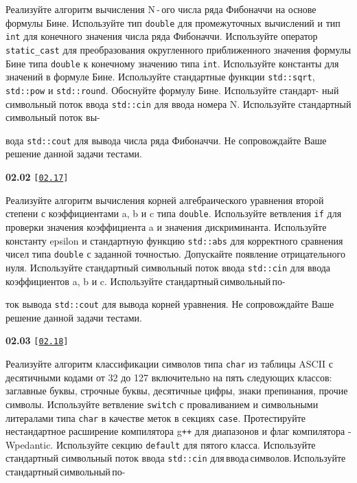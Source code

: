 \documentclass[a4paper,12pt]{article}
\begin{document}
\bigskip

Реализуйте алгоритм вычисления N\,-\,ого числа ряда Фибоначчи на основе формулы Бине. Используйте тип \lstinline{double} для промежуточных вычислений и тип \lstinline{int} для конечного значения числа ряда Фибоначчи. Используйте оператор \lstinline{static_cast} для преобразования округленного приближенного значения формулы Бине типа \lstinline{double} к конечному значению типа \lstinline{int}. Используйте константы для значений в формуле Бине. Используйте стандартные функции \lstinline{std::sqrt}, \lstinline{std::pow} и \lstinline{std::round}. Обоснуйте формулу Бине. Используйте стандарт- ный символьный поток ввода \lstinline{std::cin} для ввода номера N. Используйте стандартный символьный поток вы- 

вода \lstinline{std::cout} для вывода числа ряда Фибоначчи. Не сопровождайте Ваше решение данной задачи тестами.

\bigskip

{\large \textbf{02.02} \texttt{[\href{https://github.com/i-s-m-mipt/Education/blob/master/projects/examples/source/02.17.cpp}{\texttt{02.17}}]}}

\bigskip

Реализуйте алгоритм вычисления корней алгебраического уравнения второй степени с коэффициентами a, b и c типа \lstinline{double}. Используйте ветвления \lstinline{if} для проверки значения коэффициента a и значения дискриминанта. Используйте константу epsilon и стандартную функцию \lstinline{std::abs} для корректного сравнения чисел типа \lstinline{double} с заданной точностью. Допускайте появление отрицательного нуля. Используйте стандартный символьный поток ввода \lstinline{std::cin} для ввода коэффициентов a, b и c. Используйте стандартный\,символьный\,по- 

ток вывода \lstinline{std::cout} для вывода корней уравнения. Не сопровождайте Ваше решение данной задачи тестами.

\bigskip

{\large \textbf{02.03} \texttt{[\href{https://github.com/i-s-m-mipt/Education/blob/master/projects/examples/source/02.18.cpp}{\texttt{02.18}}]}}

\bigskip

Реализуйте алгоритм классификации символов типа \lstinline{char} из таблицы ASCII с десятичными кодами от 32 до 127 включительно на пять следующих классов: заглавные буквы, строчные буквы, десятичные цифры, знаки препинания, прочие символы. Используйте ветвление \lstinline{switch} с проваливанием и символьными литералами типа \lstinline{char} в качестве меток в секциях \lstinline{case}. Протестируйте нестандартное расширение компилятора g\texttt{++} для диапазонов и флаг компилятора -Wpedantic. Используйте секцию \lstinline{default} для пятого класса. Используйте стандартный символьный поток ввода \lstinline{std::cin} для\,ввода\,символов.\,Используйте\,стандартный\,символьный\,по- 
\end{document}
